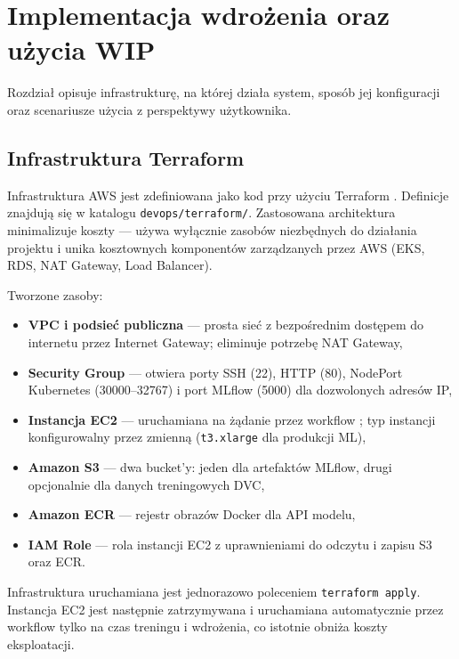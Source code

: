 \section{Implementacja wdrożenia oraz użycia WIP}
\label{sec:Implementacja_wdrozenia}

Rozdział opisuje infrastrukturę, na której działa system, sposób jej konfiguracji oraz scenariusze użycia z perspektywy użytkownika.

\subsection{Infrastruktura Terraform}

Infrastruktura AWS jest zdefiniowana jako kod przy użyciu Terraform \cite{hashicorp_terraform}. Definicje znajdują się w katalogu \texttt{devops/terraform/}. Zastosowana architektura minimalizuje koszty --- używa wyłącznie zasobów niezbędnych do działania projektu i unika kosztownych komponentów zarządzanych przez AWS (EKS, RDS, NAT Gateway, Load Balancer).

Tworzone zasoby:
\begin{itemize}
  \item \textbf{VPC i podsieć publiczna} --- prosta sieć z bezpośrednim dostępem do internetu przez Internet Gateway; eliminuje potrzebę NAT Gateway,
  \item \textbf{Security Group} --- otwiera porty SSH (22), HTTP (80), NodePort Kubernetes (30000--32767) i port MLflow (5000) dla dozwolonych adresów IP,
  \item \textbf{Instancja EC2} --- uruchamiana na żądanie przez workflow \cite{github_actions_docs}; typ instancji konfigurowalny przez zmienną (\texttt{t3.xlarge} dla produkcji ML),
  \item \textbf{Amazon S3} --- dwa bucket'y: jeden dla artefaktów MLflow, drugi opcjonalnie dla danych treningowych DVC,
  \item \textbf{Amazon ECR} --- rejestr obrazów Docker dla API modelu,
  \item \textbf{IAM Role} --- rola instancji EC2 z uprawnieniami do odczytu i zapisu S3 oraz ECR.
\end{itemize}

Infrastruktura uruchamiana jest jednorazowo poleceniem \texttt{terraform apply}. Instancja EC2 jest następnie zatrzymywana i uruchamiana automatycznie przez workflow tylko na czas treningu i wdrożenia, co istotnie obniża koszty eksploatacji.


